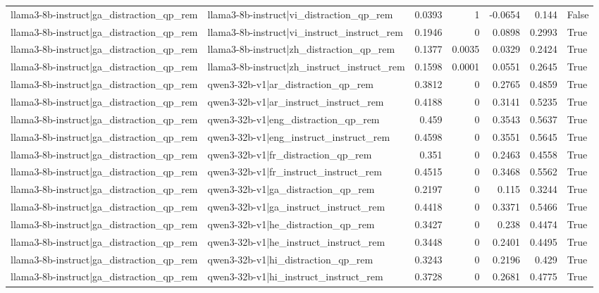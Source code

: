 \begin{table}
\begin{tabular}{l l r r r r l}
llama3-8b-instruct|ga_distraction_qp_rem & llama3-8b-instruct|vi_distraction_qp_rem & 0.0393 & 1 & -0.0654 & 0.144 & False \\
llama3-8b-instruct|ga_distraction_qp_rem & llama3-8b-instruct|vi_instruct_instruct_rem & 0.1946 & 0 & 0.0898 & 0.2993 & True \\
llama3-8b-instruct|ga_distraction_qp_rem & llama3-8b-instruct|zh_distraction_qp_rem & 0.1377 & 0.0035 & 0.0329 & 0.2424 & True \\
llama3-8b-instruct|ga_distraction_qp_rem & llama3-8b-instruct|zh_instruct_instruct_rem & 0.1598 & 0.0001 & 0.0551 & 0.2645 & True \\
llama3-8b-instruct|ga_distraction_qp_rem & qwen3-32b-v1|ar_distraction_qp_rem & 0.3812 & 0 & 0.2765 & 0.4859 & True \\
llama3-8b-instruct|ga_distraction_qp_rem & qwen3-32b-v1|ar_instruct_instruct_rem & 0.4188 & 0 & 0.3141 & 0.5235 & True \\
llama3-8b-instruct|ga_distraction_qp_rem & qwen3-32b-v1|eng_distraction_qp_rem & 0.459 & 0 & 0.3543 & 0.5637 & True \\
llama3-8b-instruct|ga_distraction_qp_rem & qwen3-32b-v1|eng_instruct_instruct_rem & 0.4598 & 0 & 0.3551 & 0.5645 & True \\
llama3-8b-instruct|ga_distraction_qp_rem & qwen3-32b-v1|fr_distraction_qp_rem & 0.351 & 0 & 0.2463 & 0.4558 & True \\
llama3-8b-instruct|ga_distraction_qp_rem & qwen3-32b-v1|fr_instruct_instruct_rem & 0.4515 & 0 & 0.3468 & 0.5562 & True \\
llama3-8b-instruct|ga_distraction_qp_rem & qwen3-32b-v1|ga_distraction_qp_rem & 0.2197 & 0 & 0.115 & 0.3244 & True \\
llama3-8b-instruct|ga_distraction_qp_rem & qwen3-32b-v1|ga_instruct_instruct_rem & 0.4418 & 0 & 0.3371 & 0.5466 & True \\
llama3-8b-instruct|ga_distraction_qp_rem & qwen3-32b-v1|he_distraction_qp_rem & 0.3427 & 0 & 0.238 & 0.4474 & True \\
llama3-8b-instruct|ga_distraction_qp_rem & qwen3-32b-v1|he_instruct_instruct_rem & 0.3448 & 0 & 0.2401 & 0.4495 & True \\
llama3-8b-instruct|ga_distraction_qp_rem & qwen3-32b-v1|hi_distraction_qp_rem & 0.3243 & 0 & 0.2196 & 0.429 & True \\
llama3-8b-instruct|ga_distraction_qp_rem & qwen3-32b-v1|hi_instruct_instruct_rem & 0.3728 & 0 & 0.2681 & 0.4775 & True \\

\end{tabular}
\end{table}
